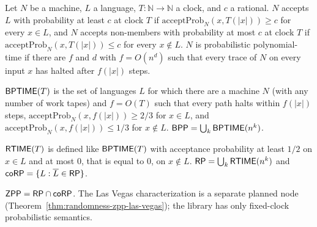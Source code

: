 \begin{definition}
  \label{def:randomness-ppt}
  \leanok
  Let $N$ be a machine, $L$ a language, $T \colon \mathbb{N} \to \mathbb{N}$ a
  clock, and $c$ a rational. $N$ accepts $L$ with probability at least $c$ at
  clock $T$ if $\mathrm{acceptProb}_N(x, T(|x|)) \ge c$ for every $x \in L$,
  and $N$ accepts non-members with probability at most $c$ at clock $T$ if
  $\mathrm{acceptProb}_N(x, T(|x|)) \le c$ for every $x \notin L$. $N$ is
  probabilistic polynomial-time if there are $f$ and $d$ with $f = O(n^d)$
  such that every trace of $N$ on every input $x$ has halted after $f(|x|)$
  steps.
\end{definition}

\begin{definition}[$\cc{BPP}$]
  \label{def:BPP}
  \leanok
  $\mathsf{BPTIME}(T)$ is the set of languages $L$ for which there are a machine
  $N$ (with any number of work tapes) and $f = O(T)$ such that every path
  halts within $f(|x|)$ steps, $\mathrm{acceptProb}_N(x, f(|x|)) \ge 2/3$ for
  $x \in L$, and $\mathrm{acceptProb}_N(x, f(|x|)) \le 1/3$ for $x \notin L$.
  $\mathsf{BPP} = \bigcup_k \mathsf{BPTIME}(n^k)$.
\end{definition}

\begin{definition}
  \label{def:RP}
  \leanok
  $\mathsf{RTIME}(T)$ is defined like $\mathsf{BPTIME}(T)$ with acceptance probability
  at least $1/2$ on $x \in L$ and at most $0$, that is equal to $0$, on
  $x \notin L$. $\mathsf{RP} = \bigcup_k \mathsf{RTIME}(n^k)$ and
  $\mathsf{coRP} = \{L : \overline{L} \in \mathsf{RP}\}$.
\end{definition}

\begin{definition}[$\cc{ZPP}$]
  \label{def:ZPP}
  \leanok
  $\mathsf{ZPP} = \mathsf{RP} \cap \mathsf{coRP}$. The Las Vegas characterization is a
  separate planned node (Theorem~\ref{thm:randomness-zpp-las-vegas}); the
  library has only fixed-clock probabilistic semantics.
\end{definition}

